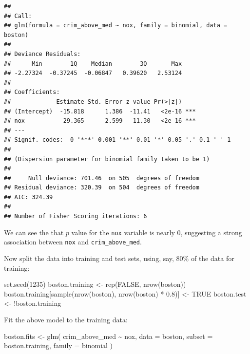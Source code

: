 \documentclass[
]{book}
\newenvironment{Shaded}{\begin{snugshade}}{\end{snugshade}}
\newcommand{\AttributeTok}[1]{\textcolor[rgb]{0.77,0.63,0.00}{#1}}
\newcommand{\ConstantTok}[1]{\textcolor[rgb]{0.00,0.00,0.00}{#1}}
\newcommand{\DecValTok}[1]{\textcolor[rgb]{0.00,0.00,0.81}{#1}}
\newcommand{\FloatTok}[1]{\textcolor[rgb]{0.00,0.00,0.81}{#1}}
\newcommand{\FunctionTok}[1]{\textcolor[rgb]{0.00,0.00,0.00}{#1}}
\newcommand{\NormalTok}[1]{#1}
\newcommand{\OtherTok}[1]{\textcolor[rgb]{0.56,0.35,0.01}{#1}}
\newcommand{\SpecialCharTok}[1]{\textcolor[rgb]{0.00,0.00,0.00}{#1}}
\begin{document}
\begin{verbatim}
## 
## Call:
## glm(formula = crim_above_med ~ nox, family = binomial, data = boston)
## 
## Deviance Residuals: 
##      Min        1Q    Median        3Q       Max  
## -2.27324  -0.37245  -0.06847   0.39620   2.53124  
## 
## Coefficients:
##             Estimate Std. Error z value Pr(>|z|)    
## (Intercept)  -15.818      1.386  -11.41   <2e-16 ***
## nox           29.365      2.599   11.30   <2e-16 ***
## ---
## Signif. codes:  0 '***' 0.001 '**' 0.01 '*' 0.05 '.' 0.1 ' ' 1
## 
## (Dispersion parameter for binomial family taken to be 1)
## 
##     Null deviance: 701.46  on 505  degrees of freedom
## Residual deviance: 320.39  on 504  degrees of freedom
## AIC: 324.39
## 
## Number of Fisher Scoring iterations: 6
\end{verbatim}

We can see the that \(p\) value for the \texttt{nox} variable is nearly 0, suggesting a strong association between \texttt{nox} and \texttt{crim\_above\_med}.

Now split the data into training and test sets, using, say, 80\% of the data for training:

\begin{Shaded}
\begin{Highlighting}[]
\FunctionTok{set.seed}\NormalTok{(}\DecValTok{1235}\NormalTok{)}
\NormalTok{boston.training }\OtherTok{\textless{}{-}} \FunctionTok{rep}\NormalTok{(}\ConstantTok{FALSE}\NormalTok{, }\FunctionTok{nrow}\NormalTok{(boston))}
\NormalTok{boston.training[}\FunctionTok{sample}\NormalTok{(}\FunctionTok{nrow}\NormalTok{(boston), }\FunctionTok{nrow}\NormalTok{(boston) }\SpecialCharTok{*} \FloatTok{0.8}\NormalTok{)] }\OtherTok{\textless{}{-}} \ConstantTok{TRUE}
\NormalTok{boston.test }\OtherTok{\textless{}{-}} \SpecialCharTok{!}\NormalTok{boston.training}
\end{Highlighting}
\end{Shaded}

Fit the above model to the training data:

\begin{Shaded}
\begin{Highlighting}[]
\NormalTok{boston.fits }\OtherTok{\textless{}{-}}
  \FunctionTok{glm}\NormalTok{(}
\NormalTok{    crim\_above\_med }\SpecialCharTok{\textasciitilde{}}\NormalTok{ nox,}
    \AttributeTok{data =}\NormalTok{ boston,}
    \AttributeTok{subset =}\NormalTok{ boston.training,}
    \AttributeTok{family =}\NormalTok{ binomial}
\NormalTok{  )}
\end{Highlighting}
\end{Shaded}
\end{document}
